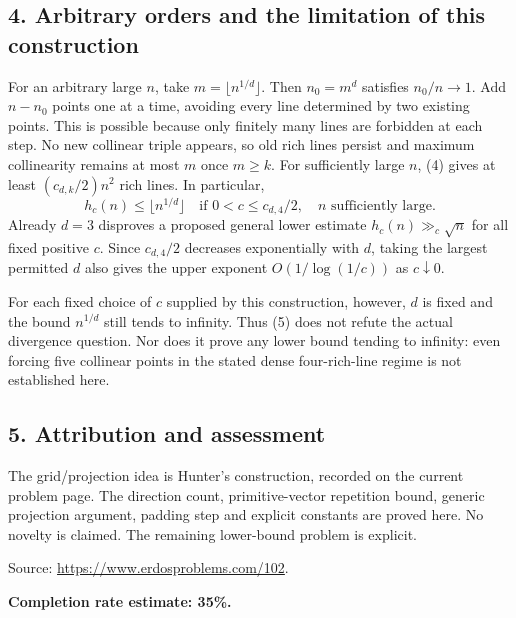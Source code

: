 \subsection*{4. Arbitrary orders and the limitation of this construction}
For an arbitrary large $n$, take $m=\lfloor n^{1/d}\rfloor$. Then $n_0=m^d$ satisfies $n_0/n\to1$. Add $n-n_0$ points one at a time, avoiding every line determined by two existing points. This is possible because only finitely many lines are forbidden at each step. No new collinear triple appears, so old rich lines persist and maximum collinearity remains at most $m$ once $m\ge k$. For sufficiently large $n$, (4) gives at least $(c_{d,k}/2)n^2$ rich lines. In particular,
\[
 h_c(n)\le\lfloor n^{1/d}\rfloor
 \quad\text{if }0<c\le c_{d,4}/2,
 \quad n\text{ sufficiently large}.\tag{5}
\]
Already $d=3$ disproves a proposed general lower estimate $h_c(n)\gg_c\sqrt n$ for all fixed positive $c$. Since $c_{d,4}/2$ decreases exponentially with $d$, taking the largest permitted $d$ also gives the upper exponent $O(1/\log(1/c))$ as $c\downarrow0$.

For each fixed choice of $c$ supplied by this construction, however, $d$ is fixed and the bound $n^{1/d}$ still tends to infinity. Thus (5) does not refute the actual divergence question. Nor does it prove any lower bound tending to infinity: even forcing five collinear points in the stated dense four-rich-line regime is not established here.

\subsection*{5. Attribution and assessment}
The grid/projection idea is Hunter's construction, recorded on the current problem page. The direction count, primitive-vector repetition bound, generic projection argument, padding step and explicit constants are proved here. No novelty is claimed. The remaining lower-bound problem is explicit.

Source: \url{https://www.erdosproblems.com/102}.

\textbf{Completion rate estimate: 35\%.}

